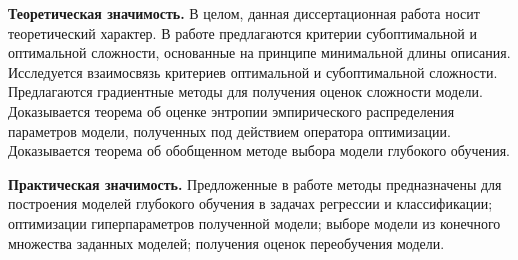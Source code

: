 \vspace{0.5cm}
\textbf{Теоретическая значимость.} В целом, данная диссертационная работа носит теоретический характер. В работе предлагаются критерии субоптимальной и оптимальной сложности, основанные на принципе минимальной длины описания. Исследуется взаимосвязь критериев оптимальной и субоптимальной сложности. Предлагаются градиентные методы для получения оценок сложности модели. Доказывается теорема об оценке энтропии эмпирического распределения параметров модели, полученных под действием оператора оптимизации.
Доказывается теорема об обобщенном методе выбора модели глубокого обучения.


\vspace{0.5cm}
\textbf{Практическая значимость.} Предложенные в работе методы предназначены для построения моделей глубокого обучения в задачах регрессии и классификации; оптимизации гиперпараметров полученной модели; выборе модели из конечного множества заданных моделей; получения оценок переобучения модели.


